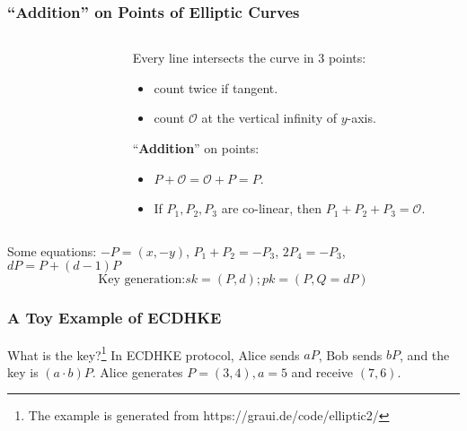 \begin{frame}\frametitle{``Addition'' on Points of Elliptic Curves}
\begin{columns}
\begin{column}{5cm}
\begin{figure}
\begin{center}

\end{center}
\end{figure}
\end{column}
\begin{column}{5cm}
Every line intersects the curve in 3 points:
\begin{itemize}
\item count twice if tangent.
\item count $\mathcal{O}$ at the vertical infinity of $y$-axis.
\end{itemize}
``\textbf{Addition}'' on points:
\begin{itemize}
\item $P+\mathcal{O} = \mathcal{O} + P = P$.
\item If $P_1, P_2, P_3$ are co-linear, then $P_1 + P_2 + P_3 = \mathcal{O}$.
\end{itemize}
\end{column}
\end{columns}
Some equations: \newline
$-P=(x,-y)$, $P_1 + P_2 = -P_3$, $2P_4=-P_3$, $dP = P + (d-1)P$
\[\text{Key generation:} sk = (P,d); pk = (P,Q=dP)\]
\end{frame}
\begin{frame}\frametitle{A Toy Example of ECDHKE}
\begin{exampleblock}{What is the key?\footnote{The example is generated from https://graui.de/code/elliptic2/}}
In ECDHKE protocol, Alice sends $aP$, Bob sends $bP$, and the key is $(a\cdot b)P$. Alice generates $P=(3,4), a=5$ and receive $(7,6)$.
\end{exampleblock}
\begin{figure}
\begin{center}

\end{center}
\end{figure}
\end{frame}
